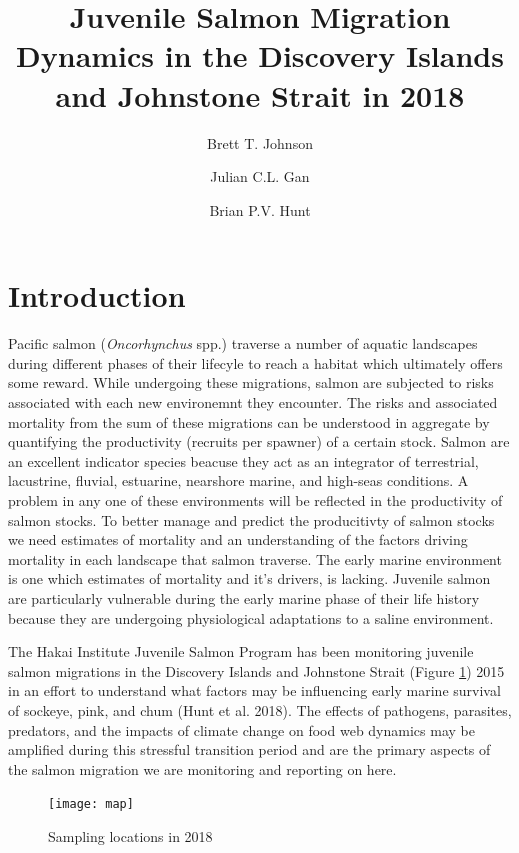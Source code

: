 \documentclass[fleqn,10pt]{wlpeerj} %
\title{Juvenile Salmon Migration Dynamics in the Discovery Islands and
Johnstone Strait in 2018}
\author[1]{Brett T. Johnson}
\author[]{Julian C.L. Gan}
\author[2, 3]{Brian P.V. Hunt}
\affil[1]{Hakai Institute Quadra Island Ecological Observatory, Heriot Bay, BC
V0P1H0}
\affil[2]{UBC EOS, IOF}
\begin{document}
\flushbottom
\maketitle
\thispagestyle{empty}

\section*{Introduction}\label{introduction}

Pacific salmon (\emph{Oncorhynchus} spp.) traverse a number of aquatic
landscapes during different phases of their lifecyle to reach a habitat
which ultimately offers some reward. While undergoing these migrations,
salmon are subjected to risks associated with each new environemnt they
encounter. The risks and associated mortality from the sum of these
migrations can be understood in aggregate by quantifying the
productivity (recruits per spawner) of a certain stock. Salmon are an
excellent indicator species beacuse they act as an integrator of
terrestrial, lacustrine, fluvial, estuarine, nearshore marine, and
high-seas conditions. A problem in any one of these environments will be
reflected in the productivity of salmon stocks. To better manage and
predict the producitivty of salmon stocks we need estimates of mortality
and an understanding of the factors driving mortality in each landscape
that salmon traverse. The early marine environment is one which
estimates of mortality and it's drivers, is lacking. Juvenile salmon are
particularly vulnerable during the early marine phase of their life
history because they are undergoing physiological adaptations to a
saline environment.

The Hakai Institute Juvenile Salmon Program has been monitoring juvenile
salmon migrations in the Discovery Islands and Johnstone Strait (Figure
\ref{fig:map}) 2015 in an effort to understand what factors may be
influencing early marine survival of sockeye, pink, and chum (Hunt et
al. 2018). The effects of pathogens, parasites, predators, and the
impacts of climate change on food web dynamics may be amplified during
this stressful transition period and are the primary aspects of the
salmon migration we are monitoring and reporting on here.

\begin{figure}

\texttt{[image: map]} \hfill{}

\caption{Sampling locations in 2018}\label{fig:map}
\end{figure}
\end{document}
